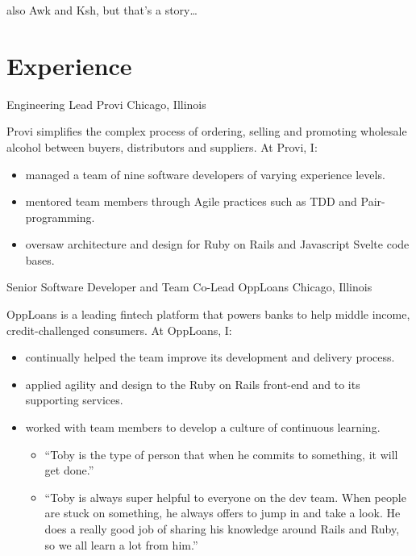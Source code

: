 \documentclass[11pt,letterpaper]{moderncv}
\begin{document}
 {\tiny also Awk and Ksh, but that's a story\ldots}

\section{Experience}

 {Engineering Lead} {Provi} {Chicago,
  Illinois} {} { %
  Provi simplifies the complex process of ordering, selling and promoting
  wholesale alcohol between buyers, distributors and suppliers.  At Provi, I:
  \begin{itemize}
  \item managed a team of nine software developers of varying experience
    levels.
  \item mentored team members through Agile practices such as TDD and
    Pair-programming.
  \item oversaw architecture and design for Ruby on Rails and Javascript
    Svelte code bases.
  \end{itemize}
}

 {Senior Software Developer and Team Co-Lead}
  {OppLoans} {Chicago, Illinois} {} { %
  OppLoans is a leading fintech platform that powers banks to help middle
  income, credit-challenged consumers.  At OppLoans, I:
  \begin{itemize}
  \item continually helped the team improve its development and delivery
    process.
  \item applied agility and design to the Ruby on Rails front-end and to its
    supporting services.
  \item worked with team members to develop a culture of continuous learning.
    \begin{itemize}
    \item ``Toby is the type of person that when he commits to something, it
      will get done.''
    \item ``Toby is always super helpful to everyone on the dev team.  When
      people are stuck on something, he always offers to jump in and take a
      look.  He does a really good job of sharing his knowledge around Rails
      and Ruby, so we all learn a lot from him.''
    \end{itemize}
  \end{itemize}
}
\end{document}

